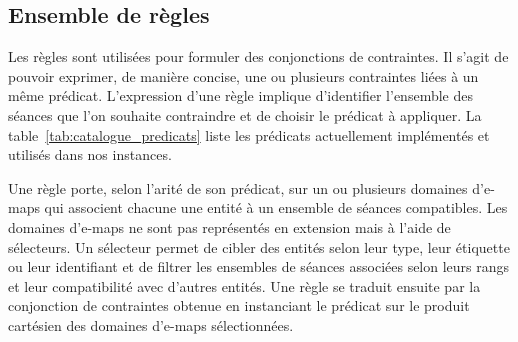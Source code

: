 \subsection{Ensemble de règles}



Les règles sont utilisées pour formuler des conjonctions de contraintes.
Il s'agit de pouvoir exprimer, de manière concise, une ou plusieurs contraintes liées à un même prédicat.
L'expression d'une règle implique d'identifier l'ensemble des séances que l'on souhaite contraindre et de choisir le prédicat à appliquer.
La table~\ref{tab:catalogue_predicats} liste les prédicats \UTP{} actuellement implémentés et utilisés dans nos instances.

Une règle porte, selon l'arité de son prédicat, sur un ou plusieurs domaines d'e-maps qui associent chacune une entité à un ensemble de séances compatibles.
Les domaines d'e-maps ne sont pas représentés en extension mais à l'aide de sélecteurs. 
Un sélecteur permet de cibler des entités selon leur type, leur étiquette ou leur identifiant et de filtrer les ensembles de séances associées selon leurs rangs et leur compatibilité avec d'autres entités.
Une règle se traduit ensuite par la conjonction de contraintes obtenue en instanciant le prédicat sur le produit cartésien des domaines d'e-maps sélectionnées.
%

